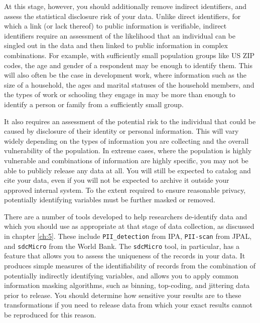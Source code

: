 At this stage, however, you should additionally remove
indirect identifiers, and assess the statistical disclosure risk of your data.
Unlike direct identifiers, for which a link (or lack thereof) to public information is verifiable,
indirect identifiers require an assessment of the likelihood
that an individual can be singled out in the data
and then linked to public information in complex combinations.
For example, with sufficiently small population groups like US ZIP codes,
the age and gender of a respondent may be enough to identify them.
This will also often be the case in development work,
where information such as the size of a household,
the ages and marital statuses of the household members,
and the types of work or schooling they engage in
may be more than enough to identify a person or family
from a sufficiently small group.

It also requires an assessment of the potential risk to the individual
that could be caused by disclosure of their identity or personal information.
This will vary widely depending on the types of information
you are collecting and the overall vulnerability of the population.
In extreme cases, where the population is highly vulnerable
and combinations of information are highly specific,
you may not be able to publicly release any data at all.
You will still be expected to catalog and cite your data,
even if you will not be expected to archive it outside your approved internal system.
To the extent required to ensure reasonable privacy,
potentially identifying variables must be further masked or removed.

There are a number of tools developed to help researchers de-identify data
and which you should use as appropriate at that stage of data collection,
as discussed in chapter \ref{ch:5}.
These include \texttt{PII\_detection}
from IPA,
\texttt{PII-scan}
from JPAL,
and \texttt{sdcMicro}
from the World Bank.
The \texttt{sdcMicro} tool, in particular, has a feature
that allows you to assess the uniqueness of the records in your data.
It produces simple measures of the identifiability of records from
the combination of potentially indirectly identifying variables,
and allows you to apply common information masking algorithms,
such as binning, top-coding, and jittering data prior to release.
You should determine how sensitive your results are to these transformations
if you need to release data from which your exact results
cannot be reproduced for this reason.

